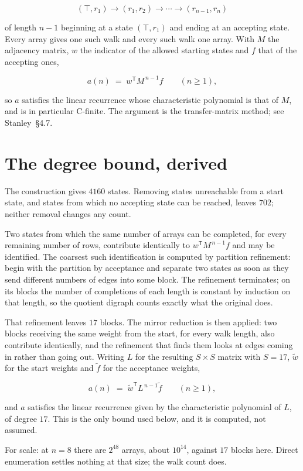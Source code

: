 \documentclass[11pt]{article}
\theoremstyle{definition}
\begin{document}
\[(\top,r_1) \to (r_1,r_2) \to \cdots \to (r_{n-1},r_n)\]

of length $n-1$ beginning at a state $(\top,r_1)$ and ending at an accepting state. Every array gives one such walk and every such walk one array. With $M$ the adjacency matrix, $w$ the indicator of the allowed starting states and $f$ that of the accepting ones,

\[a(n) \;=\; w^{\mathsf T} M^{\,n-1} f \qquad (n \ge 1),\]

so $a$ satisfies the linear recurrence whose characteristic polynomial is that of $M$, and is in particular C-finite. The argument is the transfer-matrix method; see Stanley~\S4.7.

\section{The degree bound, derived}

The construction gives $4160$ states. Removing states unreachable from a start state, and states from which no accepting state can be reached, leaves $702$; neither removal changes any count.

Two states from which the same number of arrays can be completed, for every remaining number of rows, contribute identically to $w^{\mathsf T}M^{\,n-1}f$ and may be identified. The coarsest such identification is computed by partition refinement: begin with the partition by acceptance and separate two states as soon as they send different numbers of edges into some block. The refinement terminates; on its blocks the number of completions of each length is constant by induction on that length, so the quotient digraph counts exactly what the original does.

That refinement leaves $17$ blocks. The mirror reduction is then applied: two blocks receiving the same weight from the start, for every walk length, also contribute identically, and the refinement that finds them looks at edges coming in rather than going out. Writing $L$ for the resulting $S \times S$ matrix with $S = 17$, $\tilde w$ for the start weights and $\tilde f$ for the acceptance weights,

\[a(n) \;=\; \tilde w^{\mathsf T} L^{\,n-1} \tilde f \qquad (n \ge 1),\]

and $a$ satisfies the linear recurrence given by the characteristic polynomial of $L$, of degree $17$. This is the only bound used below, and it is computed, not assumed.

For scale: at $n = 8$ there are $2^{48}$ arrays, about $10^{14}$, against $17$ blocks here. Direct enumeration settles nothing at that size; the walk count does.
\end{document}
